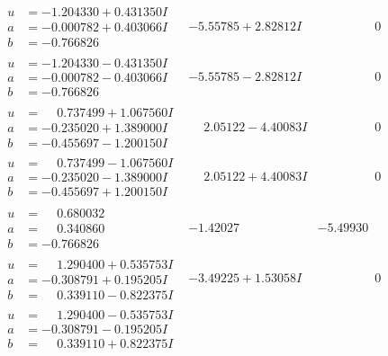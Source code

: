 \documentclass[1p]{elsarticle_modified}
\theoremstyle{definition}
\begin{document}
$$\begin{array}{c|c|c}
\begin{aligned}
u &= -1.204330 + 0.431350 I \\
a &= -0.000782 + 0.403066 I \\
b &= -0.766826\phantom{ +0.000000I}\end{aligned}
 & -5.55785 + 2.82812 I & \phantom{-0.000000 } 0 \\ \hline\begin{aligned}
u &= -1.204330 - 0.431350 I \\
a &= -0.000782 - 0.403066 I \\
b &= -0.766826\phantom{ +0.000000I}\end{aligned}
 & -5.55785 - 2.82812 I & \phantom{-0.000000 } 0 \\ \hline\begin{aligned}
u &= \phantom{-}0.737499 + 1.067560 I \\
a &= -0.235020 + 1.389000 I \\
b &= -0.455697 - 1.200150 I\end{aligned}
 & \phantom{-}2.05122 - 4.40083 I & \phantom{-0.000000 } 0 \\ \hline\begin{aligned}
u &= \phantom{-}0.737499 - 1.067560 I \\
a &= -0.235020 - 1.389000 I \\
b &= -0.455697 + 1.200150 I\end{aligned}
 & \phantom{-}2.05122 + 4.40083 I & \phantom{-0.000000 } 0 \\ \hline\begin{aligned}
u &= \phantom{-}0.680032\phantom{ +0.000000I} \\
a &= \phantom{-}0.340860\phantom{ +0.000000I} \\
b &= -0.766826\phantom{ +0.000000I}\end{aligned}
 & -1.42027\phantom{ +0.000000I} & -5.49930\phantom{ +0.000000I} \\ \hline\begin{aligned}
u &= \phantom{-}1.290400 + 0.535753 I \\
a &= -0.308791 + 0.195205 I \\
b &= \phantom{-}0.339110 - 0.822375 I\end{aligned}
 & -3.49225 + 1.53058 I & \phantom{-0.000000 } 0 \\ \hline\begin{aligned}
u &= \phantom{-}1.290400 - 0.535753 I \\
a &= -0.308791 - 0.195205 I \\
b &= \phantom{-}0.339110 + 0.822375 I\end{aligned}

\end{array}$$
\end{document}
